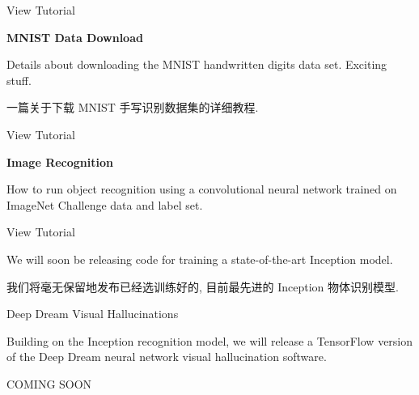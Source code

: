 View Tutorial

\textbf{MNIST Data Download}

Details about downloading the MNIST handwritten digits data set. Exciting stuff.

一篇关于下载 MNIST 手写识别数据集的详细教程.

View Tutorial

\textbf{Image Recognition}

How to run object recognition using a convolutional neural network trained on ImageNet Challenge data and label set.

View Tutorial

We will soon be releasing code for training a state-of-the-art Inception model.

我们将毫无保留地发布已经选训练好的, 目前最先进的 Inception 物体识别模型.

Deep Dream Visual Hallucinations

Building on the Inception recognition model, we will release a TensorFlow version of the Deep Dream neural network visual hallucination software.

COMING SOON